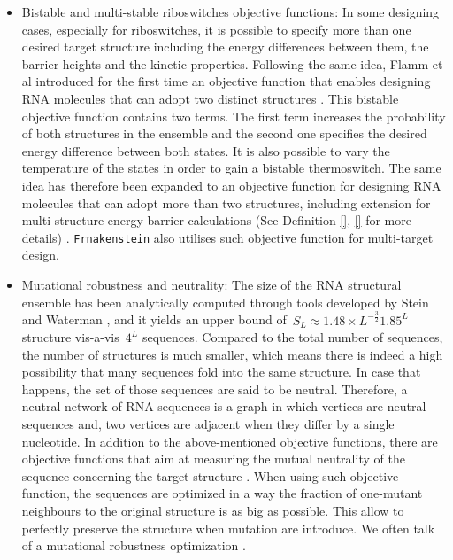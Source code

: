 \begin{itemize}
	\item Bistable and multi-stable riboswitches objective functions: In some designing cases, especially for riboswitches, it is possible to specify more than one desired target structure including the energy differences between them, the barrier heights and the kinetic properties. Following the same idea, Flamm et al introduced for the first time an objective function that enables designing RNA molecules that can adopt two distinct structures \cite{flamm2001design}. This bistable objective function contains two terms. The first term increases the probability of both structures in the ensemble and the second one specifies the desired energy difference between both states. It is also possible to vary the temperature of the states in order to gain a bistable thermoswitch. The same idea has therefore been expanded to an objective function for designing RNA molecules that can adopt more than two structures, including extension for multi-structure energy barrier calculations (See Definition \ref{}, \ref{} for more details) \cite{ramlan2011design, shu2010ardesigner}.  \texttt{Frnakenstein} \cite{lyngso2012frnakenstein} also utilises such objective function for multi-target design.
	
	\item Mutational robustness and neutrality: The size of the RNA structural ensemble has been analytically computed through tools developed by Stein and Waterman \cite{stein1979some}, and it yields an upper bound of~\(S_L\approx1.48\times L^{-\frac{3}{2}}1.85^L\) structure vis-a-vis~\(4^L\) sequences.
	Compared to the total number of sequences, the number of structures is much smaller, which means there is indeed a high possibility that many sequences fold into the same structure. In case that happens, the set of those sequences are said to be neutral. Therefore, a neutral network of RNA sequences is a graph in which vertices are neutral sequences and, two vertices are adjacent when they differ by a single nucleotide. In addition to the above-mentioned objective functions, there are objective functions that aim at measuring the mutual neutrality of the sequence concerning the target structure \cite{shu2010ardesigner}. When using such objective function, the sequences are optimized in a way the fraction of one-mutant neighbours to the original structure is as big as possible. This allow to perfectly preserve the structure when mutation are introduce. We often talk of a mutational robustness optimization \cite{avihoo2011rnaexinv}.
	
\end{itemize}



